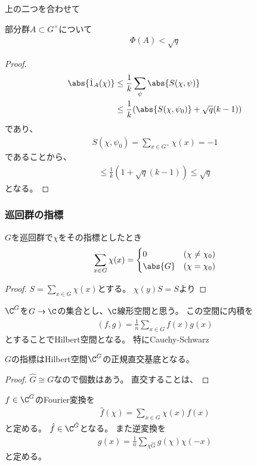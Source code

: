 \documentclass{jsarticle}
\begin{document}
上の二つを合わせて
\begin{prop}
部分群$A\subset G^\times$について
\begin{align*}
\Phi(A)<\sqrt{q}
\end{align*}
\end{prop}

\begin{proof}
\begin{align*}
\abs{\hat{1}_A(\chi)}&\leq\frac{1}{k}\sum_{\psi}\abs{S(\chi,\psi)}\\
&\leq\frac{1}{k}(\abs{S(\chi,\psi_0)}+\sqrt{q}(k-1))
\end{align*}
であり、
\begin{align*}
S(\chi,\psi_0)=\sum_{x\in G^\times}\chi(x)=-1
\end{align*}
であることから、
\begin{align*}
\leq\frac{1}{k}(1+\sqrt{q}(k-1))\leq\sqrt{q}
\end{align*}
となる。
\end{proof}

\subsubsection{巡回群の指標}
\begin{lem}
$G$を巡回群で$\chi$をその指標としたとき
\begin{align*}
\sum_{x\in G}\chi(x)=\begin{cases}0&(\chi\neq\chi_0)\\\abs{G}&(\chi=\chi_0)\end{cases}
\end{align*}
\end{lem}
\begin{proof}
$S=\sum_{x\in G}\chi(x)$とする。
$\chi(y)S=S$より
\end{proof}

$\C^G$を$G\to\C$の集合とし、$\C$線形空間と思う。
この空間に内積を
\begin{align*}
(f,g)=\frac{1}{n}\sum_{x\in G}f(x)\overline{g(x)}
\end{align*}
とすることでHilbert空間となる。
特にCauchy-Schwarz

\begin{lem}
$G$の指標はHilbert空間$\C^G$の正規直交基底となる。
\end{lem}
\begin{proof}
 $\hat{G}\cong G$なので個数はあう。
直交することは、
\end{proof}

$f\in\C^G$のFourier変換を
\begin{align*}
\hat{f}(\chi)=\sum_{x\in G}\chi(x)f(x)
\end{align*}
と定める。
$\hat{f}\in\C^{\hat{G}}$となる。
また逆変換を
\begin{align*}
g(x)=\frac{1}{n}\sum_{\chi\hat{G}}g(\chi)\chi(-x)
\end{align*}
と定める。
\end{document}
